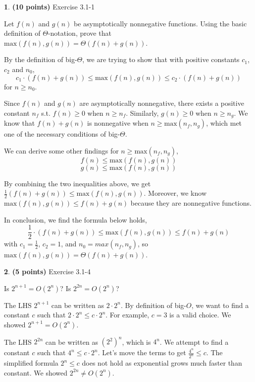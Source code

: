 \documentclass[11pt]{article}
\theoremstyle{definition}
\theoremstyle{theorem}
\newtheorem{prob}{}
\newcommand{\solution}{\medskip\noindent{\color{DarkBlue}\textbf{Solution:}}}
\begin{document}
\newpage
\begin{prob} \textbf{(10 points)} Exercise 3.1-1
\end{prob}

Let $f(n)$ and $g(n)$ be asymptotically nonnegative functions. Using the basic definition of $\Theta$-notation, prove that $\text{max}(f(n), g(n)) = \Theta(f(n) + g(n))$.

\solution

By the definition of big-$\Theta$, we are trying to show that with positive constants $c_1$, $c_2$ and $n_0$,
\[
c_1 \cdot (f(n) + g(n)) \le \text{max}(f(n), g(n)) \le c_2 \cdot (f(n) + g(n))
\]
for $n \ge n_0$.

Since $f(n)$ and $g(n)$ are asymptotically nonnegative, there exists a positive constant $n_f$ s.t. $f(n) \ge 0$ when $n \ge n_f$. Similarly,  $g(n) \ge 0$ when $n \ge n_g$. We know that $f(n) + g(n)$ is nonnegative when $n \ge \text{max}(n_f, n_g)$, which met one of the necessary conditions of big-$\Theta$.

We can derive some other findings for $n \ge \text{max}(n_f, n_g)$,
\[
f(n) \le \text{max}(f(n), g(n))
\]
\[
g(n) \le \text{max}(f(n), g(n))
\]

By combining the two inequalities above, we get $\frac{1}{2}(f(n) + g(n)) \le \text{max}(f(n), g(n))$. 
Moreover, we know $\text{max}(f(n), g(n)) \le f(n) + g(n)$ because they are nonnegative functions.

In conclusion, we find the formula below holds,
\[
\frac{1}{2} \cdot (f(n) + g(n)) \le \text{max}(f(n), g(n)) \le f(n) + g(n)
\]
with $c_1 = \frac{1}{2}$, $c_2 = 1$, and $n_0 = max(n_f, n_g)$, so $\text{max}(f(n), g(n)) = \Theta(f(n) + g(n))$.

\newpage
\begin{prob} \textbf{(5 points)} Exercise 3.1-4
\end{prob}

Is $2^{n+1} = O(2^n)$? Is $2^{2n} = O(2^n)$?

\solution

The LHS $2^{n+1}$ can be written as $2 \cdot 2^n$. By definition of big-$O$, we want to find a constant $c$ such that  $2 \cdot 2^n \leq c \cdot 2^{n}$. For example, $c = 3$ is a valid choice. We showed $2^{n+1} = O(2^n)$.

The LHS $2^{2n}$ can be written as $(2^2)^n$, which is $4^n$. We attempt to find a constant $c$ such that $4^n \leq c \cdot 2^n$. Let's move the terms to get $\frac{4^n}{2^n} \leq c$. The simplified formula $2^n \leq c$ does not hold as exponential grows much faster than constant. We showed $2^{2n} \neq O(2^n)$.
\end{document}
